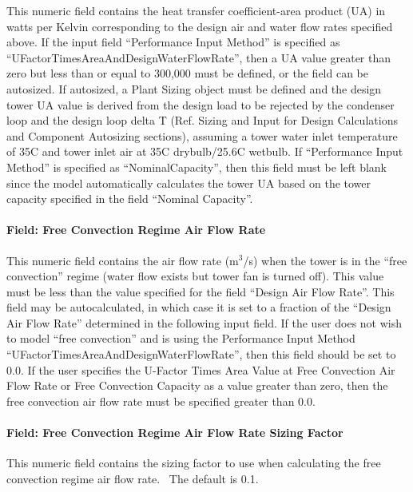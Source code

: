 This numeric field contains the heat transfer coefficient-area product (UA) in watts per Kelvin corresponding to the design air and water flow rates specified above. If the input field ``Performance Input Method'' is specified as ``UFactorTimesAreaAndDesignWaterFlowRate'', then a UA value greater than zero but less than or equal to 300,000 must be defined, or the field can be autosized. If autosized, a Plant Sizing object must be defined and the design tower UA value is derived from the design load to be rejected by the condenser loop and the design loop delta T (Ref. Sizing and Input for Design Calculations and Component Autosizing sections), assuming a tower water inlet temperature of 35C and tower inlet air at 35C drybulb/25.6C wetbulb. If ``Performance Input Method'' is specified as ``NominalCapacity'', then this field must be left blank since the model automatically calculates the tower UA based on the tower capacity specified in the field ``Nominal Capacity''.

\paragraph{Field: Free Convection Regime Air Flow Rate}\label{fieldfree-convection-regime-air-flow-rate}

This numeric field contains the air flow rate (m\(^{3}\)/s) when the tower is in the ``free convection'' regime (water flow exists but tower fan is turned off). This value must be less than the value specified for the field ``Design Air Flow Rate''. This field may be autocalculated, in which case it is set to a fraction of the ``Design Air Flow Rate'' determined in the following input field. If the user does not wish to model ``free convection'' and is using the Performance Input Method ``UFactorTimesAreaAndDesignWaterFlowRate'', then this field should be set to 0.0. If the user specifies the U-Factor Times Area Value at Free Convection Air Flow Rate or Free Convection Capacity as a value greater than zero, then the free convection air flow rate must be specified greater than 0.0.

\paragraph{Field: Free Convection Regime Air Flow Rate Sizing Factor}\label{field-free-convection-regime-air-flow-rate-sizing-factor}

This numeric field contains the sizing factor to use when calculating the free convection regime air flow rate.~ The default is 0.1.

